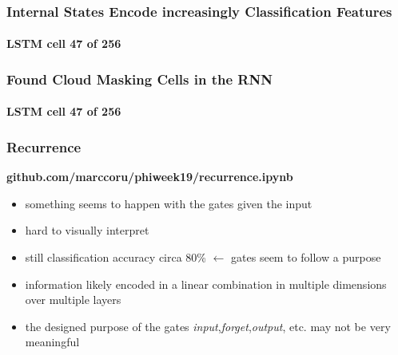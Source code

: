 %
%
%
%
%
%



\begin{frame}
\frametitle{Internal States Encode increasingly Classification Features}
\framesubtitle{LSTM cell \textbf{47} of 256}
\end{frame}
%
\begin{frame}
\frametitle{Found Cloud Masking Cells in the RNN}
\framesubtitle{LSTM cell \textbf{47} of 256}
\end{frame}

\begin{frame}
\frametitle{Recurrence}

	\textbf{github.com/marccoru/phiweek19/recurrence.ipynb}


\begin{itemize}
	\item something seems to happen with the gates given the input
	\item hard to visually interpret
	\item still classification accuracy circa 80\% $\leftarrow$ gates seem to follow a purpose
	\item information likely encoded in a linear combination in multiple dimensions over multiple layers
	\item the designed purpose of the gates \emph{input},\emph{forget},\emph{output}, etc. may not be very meaningful
\end{itemize}
\end{frame}


